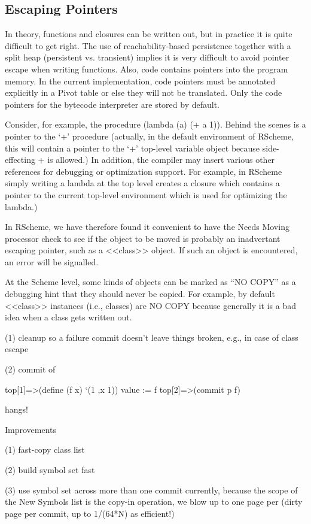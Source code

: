 \documentclass[10pt,letterpaper]{article}
\begin{document}
\subsection{Escaping Pointers}

In theory, functions and closures can be written out, but in practice
it is quite difficult to get right.  The use of reachability-based
persistence together with a split heap (persistent vs. transient)
implies it is very difficult to avoid pointer escape when writing
functions.  Also, code contains pointers into the program memory.
In the current implementation, code pointers must be annotated explicitly
in a Pivot table or else they will not be translated.  Only the code
pointers for the bytecode interpreter are stored by default.

Consider, for example, the procedure (lambda (a) (+ a 1)).  Behind the
scenes is a pointer to the `+' procedure (actually, in the default
environment of RScheme, this will contain a pointer to the `+'
top-level variable object because side-effecting + is allowed.)  In
addition, the compiler may insert various other references for debugging
or optimization support.  For example, in RScheme simply writing a lambda
at the top level creates a closure which contains a pointer to the current
top-level environment which is used for optimizing the lambda.)


In RScheme, we have therefore found it convenient to have the
Needs Moving processor check to see if the object to be moved
is probably an inadvertant escaping pointer, such as a <<class>>
object.  If such an object is encountered, an error will
be signalled.

   At the Scheme level, some kinds of objects can be marked as ``NO COPY''
   as a debugging hint that they should never be copied.  For example,
   by default <<class>> instances (i.e., classes) are NO COPY because
   generally it is a bad idea when a class gets written out.

(1) cleanup so a failure commit doesn't leave things broken, e.g.,
    in case of class escape

(2) commit of

        top[1]=>(define (f x) `(1 ,x 1))
        value := f
        top[2]=>(commit p f)


hangs!


Improvements

(1) fast-copy class list

(2) build symbol set fast

(3) use symbol set across more than one commit currently, because the
    scope of the New Symbols list is the copy-in operation, we blow up
    to one page per (dirty page per commit, up to 1/(64*N) as
    efficient!)
\end{document}

